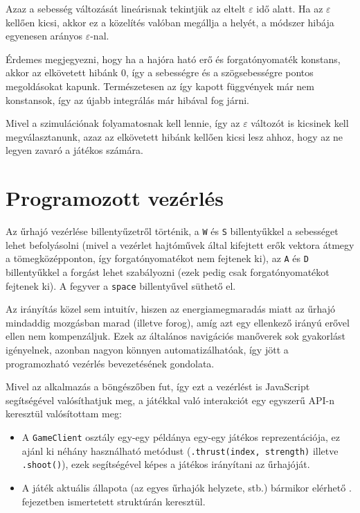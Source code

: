 Azaz a sebesség változását lineárisnak tekintjük az eltelt $\varepsilon$ idő
alatt. Ha az $\varepsilon$ kellően kicsi, akkor ez a közelítés valóban megállja
a helyét, a módszer hibája egyenesen arányos $\varepsilon$-nal.

Érdemes megjegyezni, hogy ha a hajóra ható erő és forgatónyomaték konstans,
akkor az elkövetett hibánk $0$, így a sebességre és a szögsebességre pontos
megoldásokat kapunk.  Természetesen az így kapott függvények már nem konstansok,
így az újabb integrálás már hibával fog járni.

Mivel a szimulációnak folyamatosnak kell lennie, így az $\varepsilon$ változót is
kicsinek kell megválasztanunk, azaz az elkövetett hibánk kellően kicsi lesz ahhoz,
hogy az ne legyen zavaró a játékos számára.

\section{Programozott vezérlés}

Az űrhajó vezérlése billentyűzetről történik, a \texttt{W} és \texttt{S}
billentyűkkel a sebességet lehet befolyásolni (mivel a vezérlet hajtóművek által
kifejtett erők vektora átmegy a tömegközépponton, így forgatónyomatékot nem
fejtenek ki), az \texttt{A} és \texttt{D} billentyűkkel a forgást lehet
szabályozni (ezek pedig csak forgatónyomatékot fejtenek ki). A fegyver a
\texttt{space} billentyűvel süthető el.

Az irányítás közel sem intuitív, hiszen az energiamegmaradás miatt az űrhajó
mindaddig mozgásban marad (illetve forog), amíg azt egy ellenkező irányú erővel
ellen nem kompenzáljuk. Ezek az általános navigációs manőverek sok gyakorlást
igényelnek, azonban nagyon könnyen automatizálhatóak, így jött a programozható
vezérlés bevezetésének gondolata.

Mivel az alkalmazás a böngészőben fut, így ezt a vezérlést is JavaScript
segítségével valósíthatjuk meg, a játékkal való interakciót egy egyszerű API-n
keresztül valósítottam meg:

\begin{itemize}
  \item A \texttt{GameClient} osztály egy-egy példánya egy-egy játékos
    reprezentációja, ez ajánl ki néhány használható metódust
    (\texttt{.thrust(index, strength)} illetve \texttt{.shoot()}), ezek
    segítségével képes a játékos irányítani az űrhajóját.
  \item A játék aktuális állapota (az egyes űrhajók helyzete, stb.) bármikor
    elérhető . fejezetben ismertetett struktúrán keresztül.
\end{itemize}

